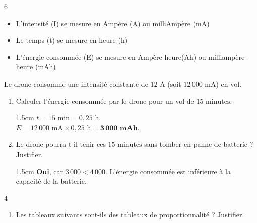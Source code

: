 \documentclass[a4paper]{book}
\begin{document}
{\begin{exerciceNote}{6}
\begin{enumerate}[leftmargin=*]
            \begin{itemize}
               \item L'intensité (I) se mesure en Ampère (A) ou milliAmpère (mA)
               \item Le temps (t) se mesure en heure (h)
               \item L'énergie consommée (E) se mesure en Ampère-heure(Ah) ou milliampère-heure (mAh)
            \end{itemize}      
            
            Le drone consomme une intensité constante de $12\text{ A}$ (soit $12\,000\text{ mA}$) en vol.
            \begin{enumerate}[leftmargin=*]
                \item Calculer l'énergie consommée par le drone pour un vol de $15\text{ minutes}$.
                \begin{ZoneReponse}{1.5cm}                
                $t = 15 \text{ min} = 0,25 \text{ h}$. \\
                $E = 12\,000 \text{ mA} \times 0,25 \text{ h} = \mathbf{3\,000 \text{ mAh}}$.
                \end{ZoneReponse}
                
                \item Le drone pourra-t-il tenir ces $15\text{ minutes}$ sans tomber en panne de batterie ? Justifier.
                \begin{ZoneReponse}{1.5cm}                
                \textbf{Oui}, car $3\,000 < 4\,000$. L'énergie consommée est inférieure à la capacité de la batterie.
                \end{ZoneReponse}
            \end{enumerate}              
        \end{enumerate}      
    \end{exerciceNote}


\newpage


\setcounter{exo}{0}
\raggedright


    \begin{exerciceNote}{4}
        \begin{enumerate}[leftmargin=*]
            \item Les tableaux suivants sont-ils des tableaux de proportionnalité ? Justifier.
            

\end{enumerate}
\end{exerciceNote}}
\end{document}
